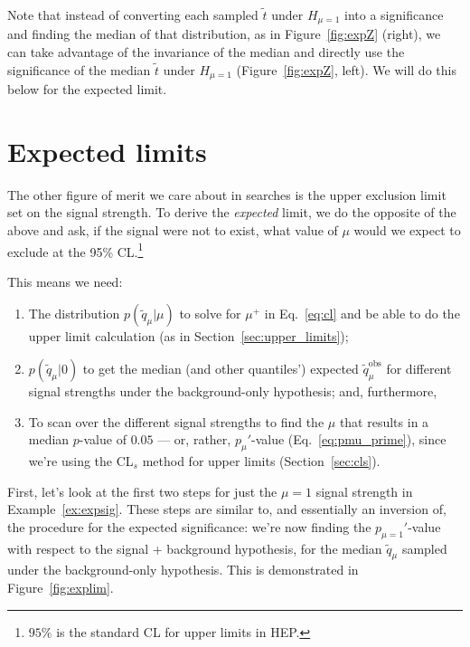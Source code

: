 Note that instead of converting each sampled $\tilde{t}$ under $H_{\mu=1}$ into a significance and finding the median of that distribution, as in Figure~\ref{fig:expZ} (right), we can take advantage of the invariance of the median and directly use the significance of the median $\tilde{t}$ under $H_{\mu=1}$ (Figure~\ref{fig:expZ}, left).
We will do this below for the expected limit.

\section{Expected limits}

The other figure of merit we care about in searches is the upper exclusion limit set on the signal strength.
To derive the \textit{expected} limit, we do the opposite of the above and ask, if the signal were not to exist, what value of $\mu$ would we expect to exclude at the 95\% CL.\footnote{$95\%$ is the standard CL for upper limits in HEP.}

This means we need:
\begin{enumerate}
  \item The distribution $p(\tilde{q}_\mu|\mu)$ to solve for $\mu^+$ in Eq.~\ref{eq:cl} and be able to do the upper limit calculation (as in Section~\ref{sec:upper_limits});
  \item $p(\tilde{q}_\mu|0)$ to get the median (and other quantiles') expected $\tilde{q}_\mu^{\mathrm{obs}}$ for different signal strengths under the background-only hypothesis; and, furthermore,
  \item To scan over the different signal strengths to find the $\mu$ that results in a median $p$-value of $0.05$ --- or, rather, $p_\mu'$-value (Eq.~\ref{eq:pmu_prime}), since we're using the CL$_s$ method for upper limits (Section~\ref{sec:cls}).
\end{enumerate}

First, let's look at the first two steps for just the $\mu = 1$ signal strength in Example~\ref{ex:expsig}.
These steps are similar to, and essentially an inversion of, the procedure for the expected significance: we're now finding the $p_{\mu=1}'$-value with respect to the signal + background hypothesis, for the median $\tilde{q}_\mu$ sampled under the background-only hypothesis.
This is demonstrated in Figure~\ref{fig:explim}.

